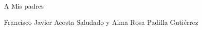 \thispagestyle{empty}
\vspace*{\fill}
\begingroup
\centering

A Mis padres

Francisco Javier Acosta Saludado y Alma Rosa Padilla Guti\'errez

\endgroup
\vspace*{\fill}